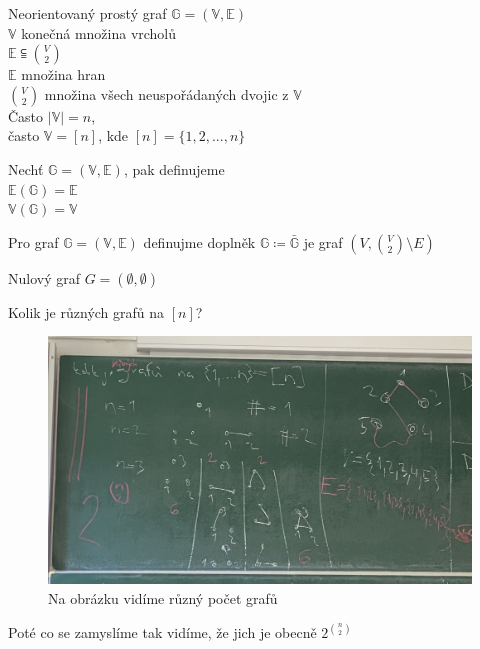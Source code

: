 \documentclass[../main.tex]{subfiles}
\begin{document}
\begin{definition}


    Neorientovaný prostý graf $\mathbb{G} = (\mathbb{V}, \mathbb{E})$ \\
    $\mathbb{V}$ konečná množina vrcholů \\
    $\mathbb{E} \subseteqq \binom{V}{2}$ \\
    $\mathbb{E} $ množina hran\\
    $\binom{V}{2}$  množina všech neuspořádaných dvojic z $\mathbb{V}$ \\


    Často $|\mathbb{V}|=n$,\\
    často $\mathbb{V} = [n]$, kde $[n] = \{1,2,...,n\}$ 
\end{definition}


\begin{definition}
    Nechť $\mathbb{G} = (\mathbb{V}, \mathbb{E})$, pak definujeme \\
    $\mathbb{E}(\mathbb{G}) = \mathbb{E}$\\
    $\mathbb{V}(\mathbb{G}) = \mathbb{V}$
\end{definition}

\begin{definition}
    Pro graf $\mathbb{G} = (\mathbb{V}, \mathbb{E})$ definujme  doplněk $\mathbb{G} \coloneq \bar{\mathbb{G}}$ je graf $(V, \binom{V}{2}\setminus E )$
\end{definition}

\begin{definition}
    Nulový graf $G = (\emptyset, \emptyset)$ 
\end{definition}

\begin{example}
    Kolik je různých grafů na $[n]$?

    \begin{figure}[H]
        \centering
        \includegraphics[width=\textwidth/2]{images/27-9-pocetgrafu.png}
        \caption*{Na obrázku vidíme různý počet grafů}
    \end{figure} 

    Poté co se zamyslíme tak vidíme, že jich je obecně $2^{\binom{n}{2}}$
\end{example}
\end{document}
